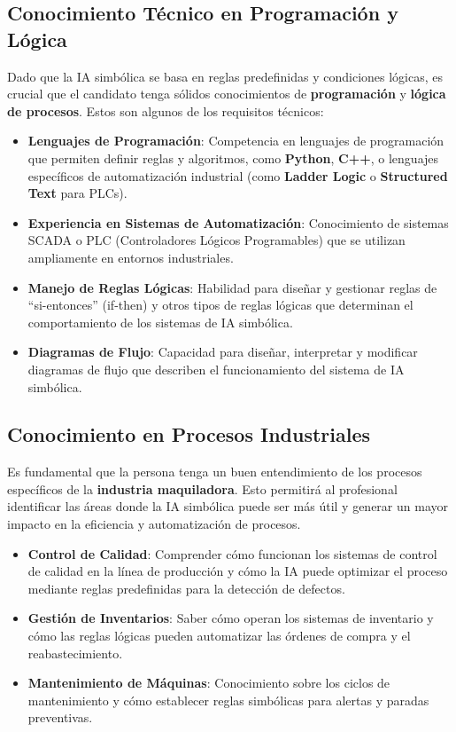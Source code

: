 \subsection{Conocimiento Técnico en Programación y Lógica}

Dado que la IA simbólica se basa en reglas predefinidas y condiciones lógicas, es crucial que el candidato tenga sólidos conocimientos de \textbf{programación} y \textbf{lógica de procesos}. Estos son algunos de los requisitos técnicos:

\begin{itemize}
    \item \textbf{Lenguajes de Programación}: Competencia en lenguajes de programación que permiten definir reglas y algoritmos, como \textbf{Python}, \textbf{C++}, o lenguajes específicos de automatización industrial (como \textbf{Ladder Logic} o \textbf{Structured Text} para PLCs).
    \item \textbf{Experiencia en Sistemas de Automatización}: Conocimiento de sistemas SCADA o PLC (Controladores Lógicos Programables) que se utilizan ampliamente en entornos industriales.
    \item \textbf{Manejo de Reglas Lógicas}: Habilidad para diseñar y gestionar reglas de ``si-entonces'' (if-then) y otros tipos de reglas lógicas que determinan el comportamiento de los sistemas de IA simbólica.
    \item \textbf{Diagramas de Flujo}: Capacidad para diseñar, interpretar y modificar diagramas de flujo que describen el funcionamiento del sistema de IA simbólica.
\end{itemize}

\subsection{Conocimiento en Procesos Industriales}

Es fundamental que la persona tenga un buen entendimiento de los procesos específicos de la \textbf{industria maquiladora}. Esto permitirá al profesional identificar las áreas donde la IA simbólica puede ser más útil y generar un mayor impacto en la eficiencia y automatización de procesos.

\begin{itemize}
    \item \textbf{Control de Calidad}: Comprender cómo funcionan los sistemas de control de calidad en la línea de producción y cómo la IA puede optimizar el proceso mediante reglas predefinidas para la detección de defectos.
    \item \textbf{Gestión de Inventarios}: Saber cómo operan los sistemas de inventario y cómo las reglas lógicas pueden automatizar las órdenes de compra y el reabastecimiento.
    \item \textbf{Mantenimiento de Máquinas}: Conocimiento sobre los ciclos de mantenimiento y cómo establecer reglas simbólicas para alertas y paradas preventivas.
\end{itemize}

